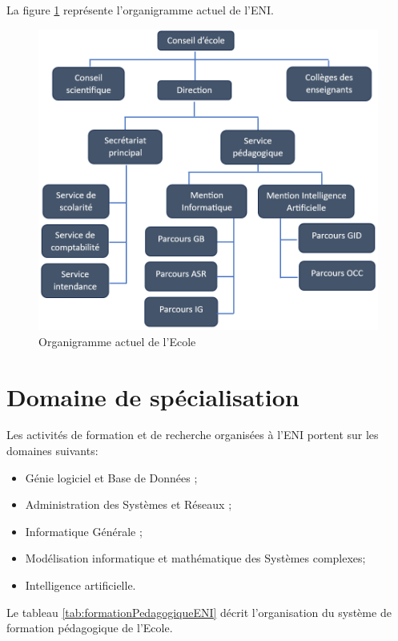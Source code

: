 \documentclass[12pt]{report}
\begin{document}
				La figure \ref{fig:OrganigrammeENI} représente l’organigramme actuel de l’ENI.

				\begin{figure}[h]
					\centering
					\includegraphics[width=\textwidth]{image4.png}
					\caption{Organigramme actuel de l’Ecole}
					\label{fig:OrganigrammeENI}
				\end{figure}
				\clearpage
				
				\section{Domaine de spécialisation}
				\hspace{15pt} Les activités de formation et de recherche organisées à l’ENI portent sur les domaines suivants: 

						\begin{itemize}
							\item Génie logiciel et Base de Données ;
							\item Administration des Systèmes et Réseaux ;
							\item Informatique Générale ;
							\item Modélisation informatique et mathématique des Systèmes complexes;
							\item Intelligence artificielle.
						\end{itemize}

				Le tableau \ref{tab:formationPedagogiqueENI} décrit l’organisation du système de formation pédagogique de l’Ecole.
\end{document}
